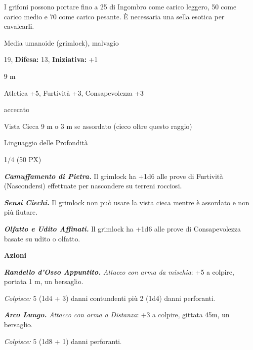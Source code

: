 \begin{multicols}{2}
{I grifoni possono portare fino a 25 di Ingombro come carico leggero, 50 come carico medio e 70 come carico pesante. È necessaria una sella esotica per cavalcarli.

\noindent
\begin{description}[noitemsep, topsep=0pt, parsep=0pt, partopsep=0pt, leftmargin=0cm, labelwidth=2.2cm]
	\item[\textbf{Taglia/Tipo:}] Media umanoide (grimlock), malvagio
	\item[\textbf{Caratt.:}] 
	\item[\textbf{Punti Ferita:}] 19,  \textbf{Difesa:} 13,  \textbf{Iniziativa:} +1
	\item[\textbf{Movimento:}] 9 m
	\item[\textbf{Tiri Salvez.:}] 
	\item[\textbf{Comp.:}] Atletica +5, Furtività +3, Consapevolezza +3
	\item[\textbf{Immunità:}] accecato
	\item[\textbf{Sensi:}] Vista Cieca 9 m o 3 m se assordato (cieco oltre questo raggio)
	\item[\textbf{Linguaggi:}] Linguaggio delle Profondità
	\item[\textbf{Sfida:}] 1/4 (50 PX)\smallskip
\end{description}

\emph{\textbf{Camuffamento di Pietra.}} Il grimlock ha +1d6 alle prove di Furtività (Nascondersi) effettuate per nascondere su terreni rocciosi.

\emph{\textbf{Sensi Ciechi.}} Il grimlock non può usare la vista cieca mentre è assordato e non più fiutare.

\emph{\textbf{Olfatto e Udito Affinati.}} Il grimlock ha +1d6 alle prove di Consapevolezza basate su udito o olfatto.

\textbf{Azioni}

\emph{\textbf{Randello d'Osso Appuntito.} Attacco con arma da mischia}: +5 a colpire, portata 1 m, un bersaglio.

\emph{Colpisce:} 5 (1d4 + 3) danni contundenti più 2 (1d4) danni perforanti.

\emph{\textbf{Arco Lungo.} Attacco con arma a Distanza}: +3 a colpire, gittata 45m, un bersaglio.

\emph{Colpisce:} 5 (1d8 + 1) danni perforanti.

}
\end{multicols}
